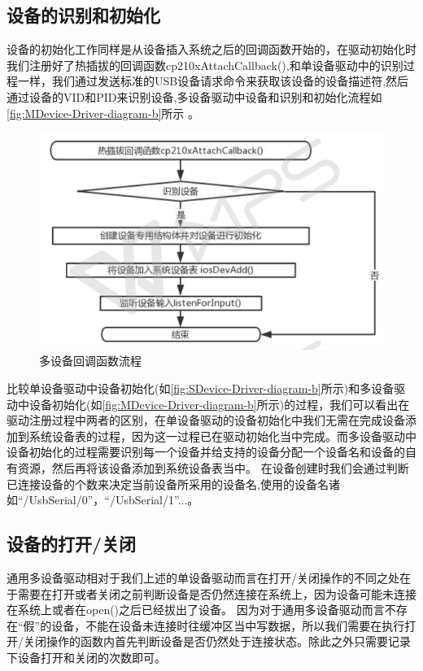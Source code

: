 \subsection{设备的识别和初始化}

设备的初始化工作同样是从设备插入系统之后的回调函数开始的，在驱动初始化时我们注册好了热插拔的回调函数cp210xAttachCallback(),和单设备驱动中的识别过程一样，我们通过发送标准的USB设备请求命令来获取该设备的设备描述符,然后通过设备的VID和PID来识别设备,多设备驱动中设备和识别和初始化流程如\autoref{fig:MDevice-Driver-diagram-b}所示 。

\begin{figure}[!h]
\centering
\includegraphics[width=1.0\textwidth]{./graphics/MDev-Drv-Diagram-b.pdf}
\caption{多设备回调函数流程}\label{fig:MDevice-Driver-diagram-b}
\end{figure}

	比较单设备驱动中设备初始化(如\autoref{fig:SDevice-Driver-diagram-b}所示)和多设备驱动中设备初始化(如\autoref{fig:MDevice-Driver-diagram-b}所示)的过程，我们可以看出在驱动注册过程中两者的区别，在单设备驱动的设备初始化中我们无需在完成设备添加到系统设备表的过程，因为这一过程已在驱动初始化当中完成。而多设备驱动中设备初始化的过程需要识别每一个设备并给支持的设备分配一个设备名和设备的自有资源，然后再将该设备添加到系统设备表当中。
	在设备创建时我们会通过判断已连接设备的个数来决定当前设备所采用的设备名,使用的设备名诸如“/UsbSerial/0”，“/UsbSerial/1”...。



\subsection{设备的打开/关闭}
	通用多设备驱动相对于我们上述的单设备驱动而言在打开/关闭操作的不同之处在于需要在打开或者关闭之前判断设备是否仍然连接在系统上，因为设备可能未连接在系统上或者在open()之后已经拔出了设备。
	因为对于通用多设备驱动而言不存在“假”的设备，不能在设备未连接时往缓冲区当中写数据，所以我们需要在执行打开/关闭操作的函数内首先判断设备是否仍然处于连接状态。除此之外只需要记录下设备打开和关闭的次数即可。
	

